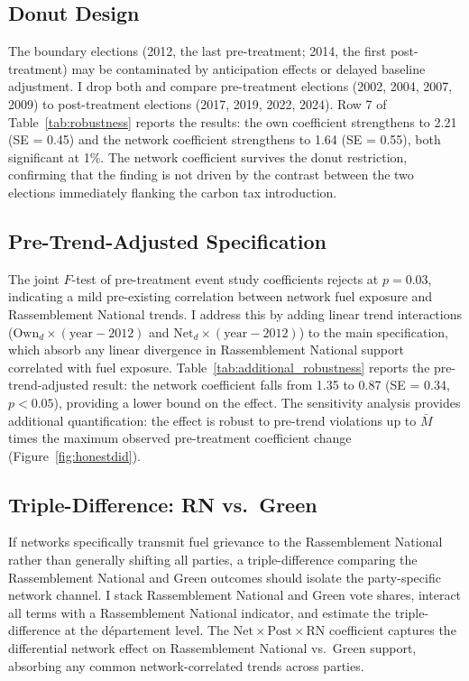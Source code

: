 \documentclass[12pt]{article}
\newcommand{\rn}{Rassemblement National}
\newcommand{\dept}{d\'{e}partement}
\begin{document}


\subsection{Donut Design}

The boundary elections (2012, the last pre-treatment; 2014, the first post-treatment) may be contaminated by anticipation effects or delayed baseline adjustment. I drop both and compare pre-treatment elections (2002, 2004, 2007, 2009) to post-treatment elections (2017, 2019, 2022, 2024). Row 7 of Table~\ref{tab:robustness} reports the results: the own coefficient strengthens to 2.21 (SE = 0.45) and the network coefficient strengthens to 1.64 (SE = 0.55), both significant at 1\%. The network coefficient survives the donut restriction, confirming that the finding is not driven by the contrast between the two elections immediately flanking the carbon tax introduction.

\subsection{Pre-Trend-Adjusted Specification}

The joint $F$-test of pre-treatment event study coefficients rejects at $p = 0.03$, indicating a mild pre-existing correlation between network fuel exposure and \rn{} trends. I address this by adding linear trend interactions ($\text{Own}_d \times (\text{year} - 2012)$ and $\text{Net}_d \times (\text{year} - 2012)$) to the main specification, which absorb any linear divergence in \rn{} support correlated with fuel exposure. Table~\ref{tab:additional_robustness} reports the pre-trend-adjusted result: the network coefficient falls from 1.35 to 0.87 (SE = 0.34, $p < 0.05$), providing a lower bound on the effect. The \citet{rambachan2023more} sensitivity analysis provides additional quantification: the effect is robust to pre-trend violations up to $\bar{M}$ times the maximum observed pre-treatment coefficient change (Figure~\ref{fig:honestdid}).

\subsection{Triple-Difference: RN vs.\ Green}

If networks specifically transmit fuel grievance to the \rn{} rather than generally shifting all parties, a triple-difference comparing the \rn{} and Green outcomes should isolate the party-specific network channel. I stack \rn{} and Green vote shares, interact all terms with a \rn{} indicator, and estimate the triple-difference at the \dept{} level. The $\text{Net} \times \text{Post} \times \text{RN}$ coefficient captures the differential network effect on \rn{} vs.\ Green support, absorbing any common network-correlated trends across parties.
\end{document}
